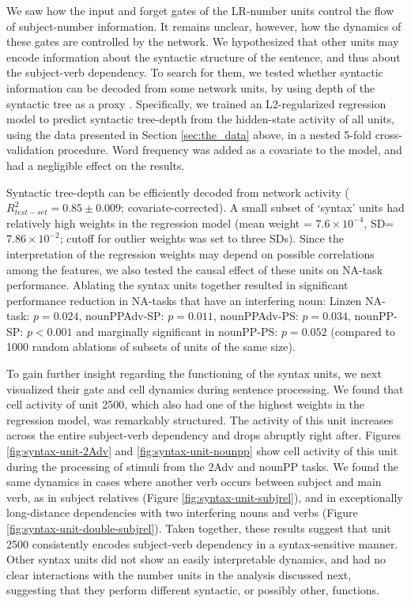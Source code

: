 We saw how the input and forget gates of the LR-number units control the flow
of subject-number information. It remains unclear, however, how the dynamics of these gates are controlled by the network. We hypothesized
that other units may encode information about the syntactic structure
of the sentence, and thus about the subject-verb dependency. To
search for them, we tested whether syntactic information can be
decoded from some network units, by using depth of the
syntactic tree as a proxy \cite{Nelson:etal:2017}. Specifically, we
trained an L2-regularized regression model to predict syntactic
tree-depth from the hidden-state activity of all units, using the data
presented in Section \ref{sec:the_data} above, in a nested 5-fold
cross-validation procedure. %
Word frequency was added as a covariate
to the model, and had a negligible effect on the results.

Syntactic tree-depth can be efficiently decoded from network activity
($R^2_{test-set}=0.85\pm0.009$; covariate-corrected). A small subset of `syntax' units had relatively high weights in the regression model (mean weight = $7.6\times{}10^{-4}$, SD=$7.86\times{}10^{-2}$; cutoff for outlier weights was set to three SDs). Since the interpretation of the regression weights may depend on possible correlations among the features, we also tested the causal effect of these units on NA-task performance. Ablating the syntax units together resulted in significant performance reduction in NA-tasks that have an interfering noun: Linzen NA-task: $p=0.024$, nounPPAdv-SP: $p=0.011$, nounPPAdv-PS: $p=0.034$, nounPP-SP: $p<0.001$ and marginally significant in nounPP-PS: $p=0.052$ (compared to 1000 random ablations of subsets of units of the same size).

To gain further insight regarding the functioning of the syntax units,
we next visualized their gate and cell dynamics during sentence
processing. We found that cell activity of unit
\unit{2}{500}, which also had one of the highest weights in the
regression model, was remarkably structured. The activity of
this unit increases across the entire subject-verb
dependency and drops abruptly right after. Figures
\ref{fig:syntax-unit-2Adv} and \ref{fig:syntax-unit-nounpp} show cell
activity of this unit during the processing of stimuli from the 2Adv
and nounPP tasks. We found the same dynamics in cases where another
verb occurs between subject and main verb, as in subject relatives
(Figure \ref{fig:syntax-unit-subjrel}), and in exceptionally
long-distance dependencies with two interfering nouns and verbs
(Figure \ref{fig:syntax-unit-double-subjrel}). Taken together, these
results suggest that unit \unit{2}{500} consistently encodes
subject-verb dependency in a syntax-sensitive manner. Other syntax
units did not show an easily interpretable dynamics, and had no clear
interactions with the number units in the analysis discussed next,
suggesting that they perform different syntactic, or possibly other, functions.